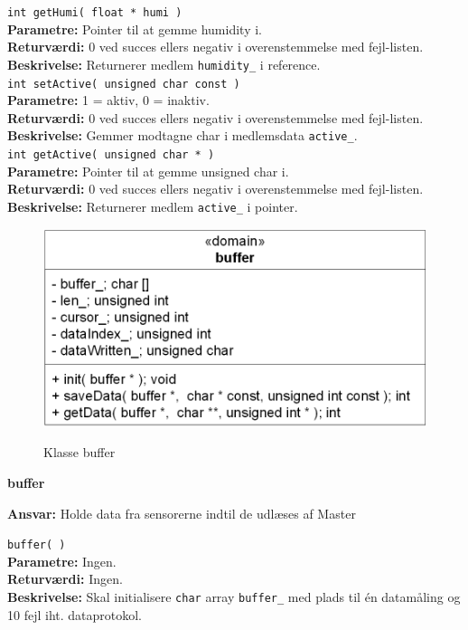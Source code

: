 \verb+int getHumi( float * humi )+ \\
\textbf{Parametre:} Pointer til at gemme humidity i. \\
\textbf{Returværdi:} 0 ved succes ellers negativ i overenstemmelse med fejl-listen. \\
\textbf{Beskrivelse:} Returnerer medlem \verb+humidity_+ i reference. \\

\verb+int setActive( unsigned char const )+ \\
\textbf{Parametre:} 1 = aktiv, 0 = inaktiv. \\
\textbf{Returværdi:} 0 ved succes ellers negativ i overenstemmelse med fejl-listen. \\
\textbf{Beskrivelse:} Gemmer modtagne char i medlemsdata \verb+active_+. \\

\verb+int getActive( unsigned char * )+ \\
\textbf{Parametre:} Pointer til at gemme unsigned char i. \\
\textbf{Returværdi:} 0 ved succes ellers negativ i overenstemmelse med fejl-listen. \\
\textbf{Beskrivelse:} Returnerer medlem \verb+active_+ i pointer. \\


\begin{figure}[htbp] \centering
{\includegraphics[scale=1.3]{filer/design/Klassediagrammer/sw_psoc_buffer}}
\caption{Klasse buffer}
\label{fig:sw_psoc_class_buffer}
\end{figure} 

{\centering
\textbf{buffer}\par
}
\textbf{Ansvar:} Holde data fra sensorerne indtil de udlæses af Master \

\verb+buffer( )+ \\
\textbf{Parametre:} Ingen. \\
\textbf{Returværdi:} Ingen. \\
\textbf{Beskrivelse:} Skal initialisere \verb+char+ array \verb+buffer_+ med plads til én datamåling og 10 fejl iht. dataprotokol. \\

